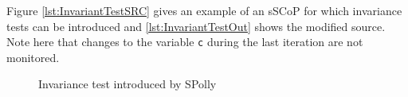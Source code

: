 Figure \ref{lst:InvariantTestSRC} gives an example of an sSCoP 
for which invariance tests can be introduced and \ref{lst:InvariantTestOut} shows
the modified source. Note here that changes to the variable \texttt{c}
during the last iteration are not
monitored. 

\lstset{frame=none}
\begin{figure}[htbp]
  \centering
  \hspace*{5mm}
  \caption{Invariance test introduced by SPolly}
  \label{lst:InvariantTest}  
\end{figure}
\resetlst












